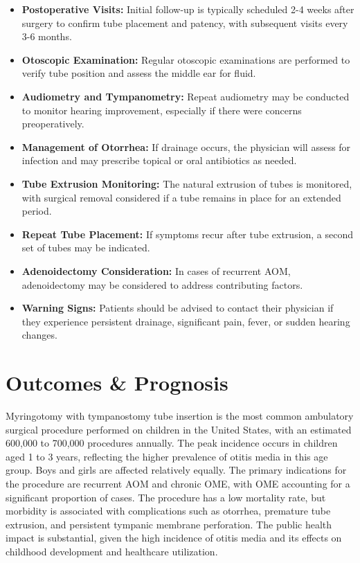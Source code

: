 \begin{itemize}
  \item \textbf{Postoperative Visits:} Initial follow-up is typically scheduled 2-4 weeks after surgery to confirm tube placement and patency, with subsequent visits every 3-6 months.
  
  \item \textbf{Otoscopic Examination:} Regular otoscopic examinations are performed to verify tube position and assess the middle ear for fluid.
  
  \item \textbf{Audiometry and Tympanometry:} Repeat audiometry may be conducted to monitor hearing improvement, especially if there were concerns preoperatively.
  
  \item \textbf{Management of Otorrhea:} If drainage occurs, the physician will assess for infection and may prescribe topical or oral antibiotics as needed.
  
  \item \textbf{Tube Extrusion Monitoring:} The natural extrusion of tubes is monitored, with surgical removal considered if a tube remains in place for an extended period.
  
  \item \textbf{Repeat Tube Placement:} If symptoms recur after tube extrusion, a second set of tubes may be indicated.
  
  \item \textbf{Adenoidectomy Consideration:} In cases of recurrent AOM, adenoidectomy may be considered to address contributing factors.
  
  \item \textbf{Warning Signs:} Patients should be advised to contact their physician if they experience persistent drainage, significant pain, fever, or sudden hearing changes.
\end{itemize}

\section*{Outcomes \& Prognosis}
Myringotomy with tympanostomy tube insertion is the most common ambulatory surgical procedure performed on children in the United States, with an estimated 600,000 to 700,000 procedures annually. The peak incidence occurs in children aged 1 to 3 years, reflecting the higher prevalence of otitis media in this age group. Boys and girls are affected relatively equally. The primary indications for the procedure are recurrent AOM and chronic OME, with OME accounting for a significant proportion of cases. The procedure has a low mortality rate, but morbidity is associated with complications such as otorrhea, premature tube extrusion, and persistent tympanic membrane perforation. The public health impact is substantial, given the high incidence of otitis media and its effects on childhood development and healthcare utilization.

